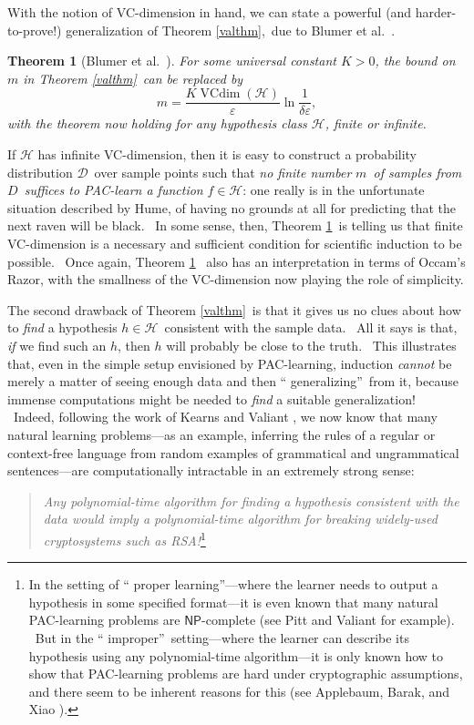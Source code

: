 \documentclass[11pt,onecolumn]{article}%
\newtheorem{theorem}{Theorem}
\begin{document}
With the notion of VC-dimension in hand, we can state a powerful (and
harder-to-prove!) generalization of Theorem \ref{valthm},\ due to Blumer et
al.\ \cite{behw}.

\begin{theorem}
[Blumer et al.\ \cite{behw}]\label{vcthm}For some universal constant $K>0$,
the bound on $m$ in Theorem \ref{valthm}\ can be replaced by%
\[
m=\frac{K\operatorname*{VCdim}\left(  \mathcal{H}\right)  }{\varepsilon}%
\ln\frac{1}{\delta\varepsilon},
\]
with the theorem now holding for any hypothesis class $\mathcal{H}$, finite or infinite.
\end{theorem}

If $\mathcal{H}$ has infinite VC-dimension, then it is easy to construct a
probability distribution $\mathcal{D}$\ over sample points such that
\textit{no finite number }$m$\textit{\ of samples from }$D$\textit{\ suffices
to PAC-learn a function} $f\in\mathcal{H}$: one really is in the unfortunate
situation described by Hume, of having no grounds at all for predicting that
the next raven will be black. \ In some sense, then, Theorem \ref{vcthm}\ is
telling us that finite VC-dimension is a necessary and sufficient condition
for scientific induction to be possible. \ Once again, Theorem \ref{vcthm}%
\ also has an interpretation in terms of Occam's Razor, with the smallness of
the VC-dimension now playing the role of simplicity.

The second drawback of Theorem \ref{valthm}\ is that it gives us no clues
about how to \textit{find} a hypothesis $h\in\mathcal{H}$\ consistent with the
sample data. \ All it says is that, \textit{if} we find such an $h$, then $h$
will probably be close to the truth. \ This illustrates that, even in the
simple setup envisioned by PAC-learning, induction \textit{cannot} be merely a
matter of seeing enough data and then \textquotedblleft
generalizing\textquotedblright\ from it, because immense computations might be
needed to \textit{find} a suitable generalization! \ Indeed, following the
work of Kearns and Valiant \cite{kv}, we now know that many natural learning
problems---as an example, inferring the rules of a regular or context-free
language from random examples of grammatical and ungrammatical sentences---are
computationally intractable in an extremely strong sense:

\begin{quotation}
\noindent\textit{Any polynomial-time algorithm for finding a hypothesis consistent with
the data would imply a polynomial-time algorithm for breaking widely-used
cryptosystems such as RSA!}\footnote{In the setting of \textquotedblleft
proper learning\textquotedblright---where the learner needs to output a
hypothesis in some specified format---it is even known that many natural
PAC-learning problems are $\mathsf{NP}$-complete (see Pitt and Valiant
\cite{pittvaliant} for example). \ But in the \textquotedblleft
improper\textquotedblright\ setting---where the learner can describe its
hypothesis using any polynomial-time algorithm---it is only known how to show
that PAC-learning problems are hard under cryptographic assumptions, and there
seem to be inherent reasons for this (see Applebaum, Barak, and Xiao
\cite{abx}).}
\end{quotation}
\end{document}
